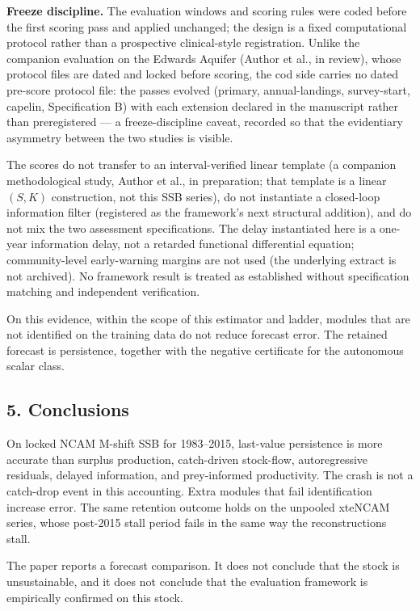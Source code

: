 \documentclass[11pt]{article}
\begin{document}
\textbf{Freeze discipline.} The evaluation windows and scoring rules
were coded before the first scoring pass and applied unchanged; the
design is a fixed computational protocol rather than a prospective
clinical-style registration. Unlike the companion evaluation on the
Edwards Aquifer (Author et al., in review), whose protocol files are
dated and locked before scoring, the cod side carries no dated pre-score
protocol file: the passes evolved (primary, annual-landings,
survey-start, capelin, Specification B) with each extension declared in
the manuscript rather than preregistered --- a freeze-discipline caveat,
recorded so that the evidentiary asymmetry between the two studies is
visible.

The scores do not transfer to an interval-verified linear template (a
companion methodological study, Author et al., in preparation; that
template is a linear \((S,K)\) construction, not this SSB series), do
not instantiate a closed-loop information filter (registered as the
framework's next structural addition), and do not mix the two assessment
specifications. The delay instantiated here is a one-year information
delay, not a retarded functional differential equation; community-level
early-warning margins are not used (the underlying extract is not
archived). No framework result is treated as established without
specification matching and independent verification.

On this evidence, within the scope of this estimator and ladder, modules
that are not identified on the training data do not reduce forecast
error. The retained forecast is persistence, together with the negative
certificate for the autonomous scalar class.

\subsection{5. Conclusions}\label{conclusions}

On locked NCAM M-shift SSB for 1983--2015, last-value persistence is
more accurate than surplus production, catch-driven stock-flow,
autoregressive residuals, delayed information, and prey-informed
productivity. The crash is not a catch-drop event in this accounting.
Extra modules that fail identification increase error. The same
retention outcome holds on the unpooled xteNCAM series, whose post-2015
stall period fails in the same way the reconstructions stall.

The paper reports a forecast comparison. It does not conclude that the
stock is unsustainable, and it does not conclude that the evaluation
framework is empirically confirmed on this stock.
\end{document}
